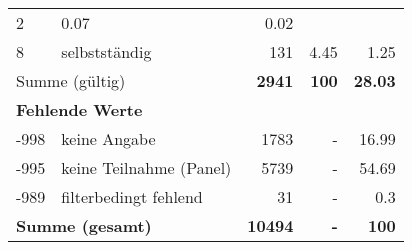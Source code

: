 \begin{longtable}{lXrrr}
       \num{2} &
       \num[round-mode=places,round-precision=2]{0.07} &
         \num[round-mode=places,round-precision=2]{0.02} \\

     8 &
     \multicolumn{1}{X}{ selbstständig   } &


       \num{131} &
       \num[round-mode=places,round-precision=2]{4.45} &
         \num[round-mode=places,round-precision=2]{1.25} \\
     \midrule
     \multicolumn{2}{l}{Summe (gültig)} &
       \textbf{\num{2941}} &
     \textbf{\num{100}} &
       \textbf{\num[round-mode=places,round-precision=2]{28.03}} \\
     \multicolumn{5}{l}{\textbf{Fehlende Werte}}\\
       -998 &
       keine Angabe &
         \num{1783} &
        - &
         \num[round-mode=places,round-precision=2]{16.99} \\
       -995 &
       keine Teilnahme (Panel) &
         \num{5739} &
        - &
         \num[round-mode=places,round-precision=2]{54.69} \\
       -989 &
       filterbedingt fehlend &
         \num{31} &
        - &
         \num[round-mode=places,round-precision=2]{0.3} \\
     \midrule
     \multicolumn{2}{l}{\textbf{Summe (gesamt)}} &
          \textbf{\num{10494}} &
        \textbf{-} &
        \textbf{\num{100}} \\
     \bottomrule
     \end{longtable}
     
